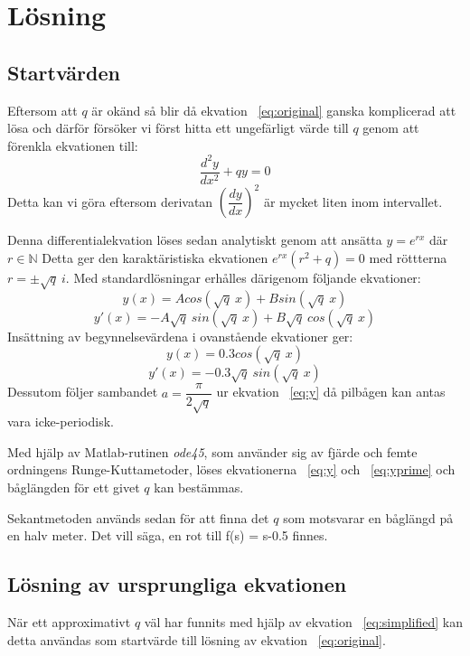 \documentclass[a4paper,11pt,twoside]{article}
\begin{document}
\section{Lösning}
\subsection{Startvärden}
Eftersom att $q$ är okänd så blir då ekvation ~\eqref{eq:original} ganska komplicerad att lösa och därför försöker vi först hitta ett ungefärligt värde till $q$ genom att förenkla ekvationen till:
\begin{equation} \label{eq:simplified}
	\dfrac{d^2y}{dx^2} + qy = 0
\end{equation}
Detta kan vi göra eftersom derivatan $\left(\dfrac{dy}{dx}\right)^2$ är mycket liten
inom intervallet.

Denna differentialekvation löses sedan analytiskt genom att ansätta $y=e^{rx}$ där $r \in \mathbb{N}$
Detta ger den karaktäristiska ekvationen $e^{rx}(r^2+q)=0$ med röttterna $r=\pm \sqrt{q}\:i$.
Med standardlösningar erhålles därigenom följande ekvationer:
\begin{equation}
 y(x) = A cos(\sqrt{q}\:x)+B sin(\sqrt{q}\:x) \nonumber
\end{equation}
\begin{equation}
 y'(x) = -A\sqrt{q}\: sin(\sqrt{q}\:x) + B\sqrt{q}\:cos(\sqrt{q}\:x) \nonumber
\end{equation}
Insättning av begynnelsevärdena i ovanstående ekvationer ger:
\begin{equation} \label{eq:y}
 y(x) = 0.3 cos(\sqrt{q}\:x)
\end{equation}
\begin{equation} \label{eq:yprime}
 y'(x) = -0.3\sqrt{q}\: sin(\sqrt{q}\:x)
\end{equation}
Dessutom följer sambandet $a=\dfrac{\pi}{2\sqrt{q}}$ ur ekvation ~\eqref{eq:y} då pilbågen kan antas vara icke-periodisk.

Med hjälp av Matlab-rutinen \textit{ode45}, som använder sig av fjärde och femte ordningens Runge-Kuttametoder, löses ekvationerna ~\eqref{eq:y} och ~\eqref{eq:yprime} och båglängden för ett givet $q$ kan bestämmas.

Sekantmetoden används sedan för att finna det $q$ som motsvarar en båglängd på en halv meter. Det vill säga, en rot till f(s) = s-0.5 finnes.

\subsection{Lösning av ursprungliga ekvationen}
När ett approximativt $q$ väl har funnits med hjälp av ekvation ~\eqref{eq:simplified} kan detta användas som startvärde till lösning av ekvation ~\eqref{eq:original}.
\end{document}

